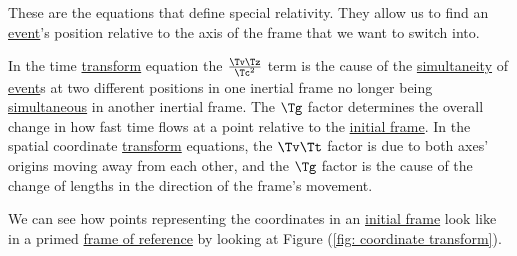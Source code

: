 These are the equations that define special relativity.
They allow us to find an \hyperlink{def-event}{event}'s position relative to the axis of the frame that we want to switch into.

In the time \hyperlink{def-transform}{transform} equation the $\frac{ {\Tv }{\Tz } }{ \Tc ^2}$ term is the cause of the \hyperlink{def-simultaneity}{simultaneity} of \hyperlink{def-event}{event}s at two different positions in one inertial frame no longer being \hyperlink{def-simultaneity}{simultaneous} in another inertial frame.
The ${\Tg }$ factor determines the overall change in how fast time flows at a point relative to the \hyperlink{def-initial-Frame}{initial frame}.
In the spatial coordinate \hyperlink{def-transform}{transform} equations, the ${\Tv }{\Tt }$ factor is due to both axes' origins moving away from each other, and the ${\Tg }$ factor is the cause of the change of lengths in the direction of the frame's movement.

We can see how points representing the coordinates in an \hyperlink{def-initial-Frame}{initial frame} look like in a primed \hyperlink{def-Reference-frame}{frame of reference} by looking at Figure (\ref{fig: coordinate transform}).

